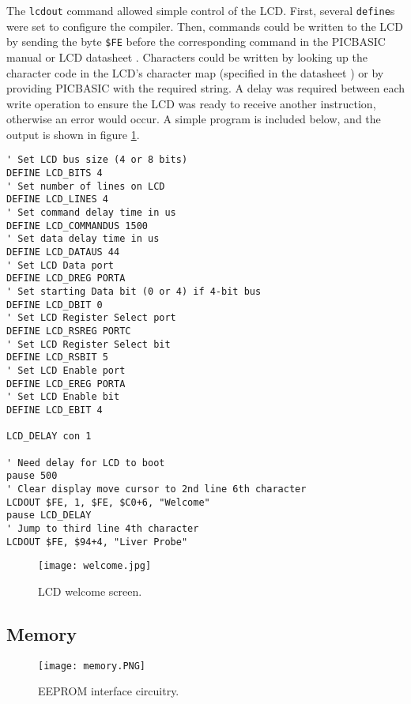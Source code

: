 The \verb|lcdout| command allowed simple control of the LCD. First, several \verb|define|s were set to configure the compiler. Then, commands could be written to the LCD by sending the byte \verb|$FE| before the corresponding command in the PICBASIC manual \cite{picbasic_pro} or LCD datasheet \cite{lcd}. Characters could be written by looking up the character code in the LCD's character map (specified in the datasheet \cite{lcd}) or by providing PICBASIC with the required string. A delay was required between each write operation to ensure the LCD was ready to receive another instruction, otherwise an error would occur. A simple program is included below, and the output is shown in figure \ref{fig: lcd}.

\begin{lstlisting}
' Set LCD bus size (4 or 8 bits)
DEFINE LCD_BITS 4
' Set number of lines on LCD
DEFINE LCD_LINES 4
' Set command delay time in us
DEFINE LCD_COMMANDUS 1500
' Set data delay time in us
DEFINE LCD_DATAUS 44
' Set LCD Data port
DEFINE LCD_DREG PORTA
' Set starting Data bit (0 or 4) if 4-bit bus
DEFINE LCD_DBIT 0
' Set LCD Register Select port
DEFINE LCD_RSREG PORTC
' Set LCD Register Select bit
DEFINE LCD_RSBIT 5
' Set LCD Enable port
DEFINE LCD_EREG PORTA
' Set LCD Enable bit
DEFINE LCD_EBIT 4

LCD_DELAY con 1

' Need delay for LCD to boot
pause 500            
' Clear display move cursor to 2nd line 6th character
LCDOUT $FE, 1, $FE, $C0+6, "Welcome"         
pause LCD_DELAY
' Jump to third line 4th character
LCDOUT $FE, $94+4, "Liver Probe"                
\end{lstlisting}

\begin{figure}[htb]
	\centering
	\texttt{[image: welcome.jpg]}
	\caption{LCD welcome screen.}
	\label{fig: lcd}
\end{figure}





\subsection{Memory}
\begin{figure}[htb]
	\centering
	\texttt{[image: memory.PNG]}
	\caption{EEPROM interface circuitry.}
	\label{fig: memory schematic}
\end{figure}

